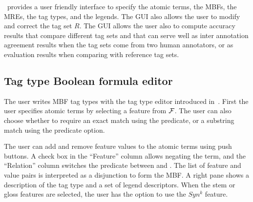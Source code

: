 \framework~provides a user friendly interface to specify the 
atomic terms, the MBFs, the MREs, 
the tag types, and the legends. 
The GUI also allows the user to modify and correct the 
tag set $R$. 
The GUI allows the user also to compute accuracy results 
that compare different tag sets and that can serve well as 
inter annotation agreement results
when the tag sets come from two human annotators, 
or as evaluation results when comparing with reference tag sets.




\subsection{Tag type Boolean formula editor}
The user writes MBF tag types with the tag type editor introduced in~\cite{JaZaMatar}. %
First the user specifies atomic terms by selecting a feature from ${\cal F}$. 
The user can also choose whether to require an exact match using the
 predicate, or a substring match using the
 predicate option.

The user can add and remove feature values to the atomic terms 
using push buttons. 
A check box in the ``Feature'' column allows negating the term, and the
``Relation'' column switches the predicate between 
 and . 
The list of feature and value pairs is interpreted as a disjunction to form
the MBF. 
A right pane shows a description of the tag type and a set of legend 
descriptors. 
When the stem or gloss features are selected, the user has the option to 
use the $Syn^k$ feature. 

